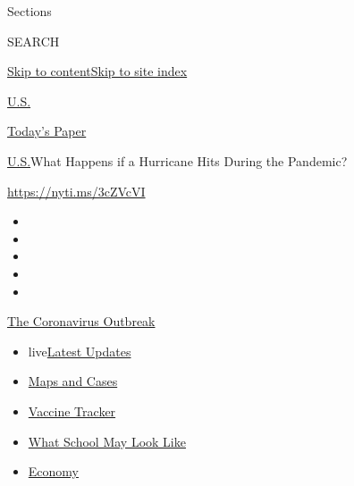 Sections

SEARCH

\protect\hyperlink{site-content}{Skip to
content}\protect\hyperlink{site-index}{Skip to site index}

\href{https://www.nytimes.com/section/us}{U.S.}

\href{https://myaccount.nytimes.com/auth/login?response_type=cookie\&client_id=vi}{}

\href{https://www.nytimes.com/section/todayspaper}{Today's Paper}

\href{/section/us}{U.S.}\textbar{}What Happens if a Hurricane Hits
During the Pandemic?

\url{https://nyti.ms/3cZVcVI}

\begin{itemize}
\item
\item
\item
\item
\item
\end{itemize}

\href{https://www.nytimes.com/news-event/coronavirus?action=click\&pgtype=Article\&state=default\&region=TOP_BANNER\&context=storylines_menu}{The
Coronavirus Outbreak}

\begin{itemize}
\tightlist
\item
  live\href{https://www.nytimes.com/2020/08/01/world/coronavirus-covid-19.html?action=click\&pgtype=Article\&state=default\&region=TOP_BANNER\&context=storylines_menu}{Latest
  Updates}
\item
  \href{https://www.nytimes.com/interactive/2020/us/coronavirus-us-cases.html?action=click\&pgtype=Article\&state=default\&region=TOP_BANNER\&context=storylines_menu}{Maps
  and Cases}
\item
  \href{https://www.nytimes.com/interactive/2020/science/coronavirus-vaccine-tracker.html?action=click\&pgtype=Article\&state=default\&region=TOP_BANNER\&context=storylines_menu}{Vaccine
  Tracker}
\item
  \href{https://www.nytimes.com/interactive/2020/07/29/us/schools-reopening-coronavirus.html?action=click\&pgtype=Article\&state=default\&region=TOP_BANNER\&context=storylines_menu}{What
  School May Look Like}
\item
  \href{https://www.nytimes.com/live/2020/07/31/business/stock-market-today-coronavirus?action=click\&pgtype=Article\&state=default\&region=TOP_BANNER\&context=storylines_menu}{Economy}
\end{itemize}

